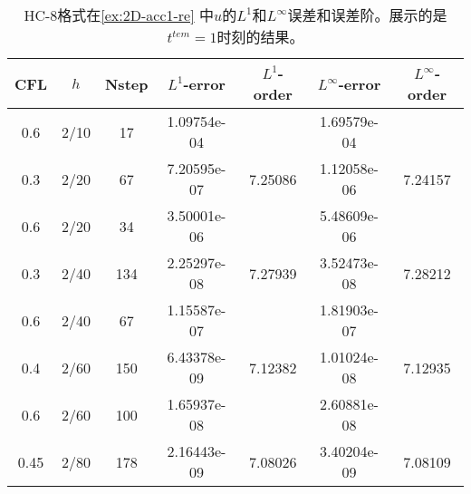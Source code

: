 \def\titleintable{CFL&$h$&Nstep&$L^1$-error&$L^1$-order&$L^\infty$-error&$L^\infty$-order\\}

\begin{table}[htbp]
  \caption{HC-8格式在\cref{ex:2D-acc1-re} 中$u$的$L^1$和$L^\infty$误差和误差阶。展示的是$t^{tem} = 1$时刻的结果。}
  \label{ta:2D-ex1-HC8}
  \centering
  \begin{tabular}{ccccccc}
    \toprule
    \titleintable
    \midrule
    0.6  & 2/10 & 17  & 1.09754e-04 &         & 1.69579e-04 &         \\
    0.3  & 2/20 & 67  & 7.20595e-07 & 7.25086 & 1.12058e-06 & 7.24157 \\
    \midrule
    0.6  & 2/20 & 34  & 3.50001e-06 &         & 5.48609e-06 &         \\
    0.3  & 2/40 & 134 & 2.25297e-08 & 7.27939 & 3.52473e-08 & 7.28212 \\
    \midrule
    0.6  & 2/40 & 67  & 1.15587e-07 &         & 1.81903e-07 &         \\
    0.4  & 2/60 & 150 & 6.43378e-09 & 7.12382 & 1.01024e-08 & 7.12935 \\
    \midrule
    0.6  & 2/60 & 100 & 1.65937e-08 &         & 2.60881e-08 &         \\
    0.45 & 2/80 & 178 & 2.16443e-09 & 7.08026 & 3.40204e-09 & 7.08109 \\
    \bottomrule
  \end{tabular}
\end{table}

